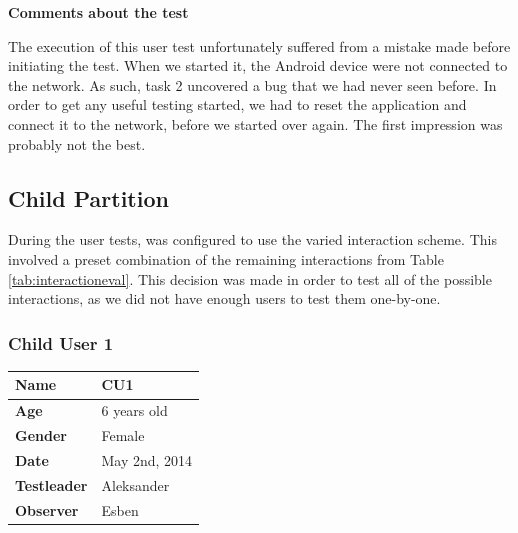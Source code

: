 \textbf{Comments about the test}

The execution of this user test unfortunately suffered from a mistake made before initiating the test. When we started it, the Android device were not connected to the network. As such, task 2 uncovered a bug that we had never seen before. In order to get any useful testing started, we had to reset the application and connect it to the network, before we started over again. The first impression was probably not the best.   


\subsection{Child Partition}
\label{sec:childresults}

During the user tests, \ab{} was configured to use the varied interaction scheme. This involved a preset combination of the remaining interactions from Table \ref{tab:interactioneval}. This decision was made in order to test all of the possible interactions, as we did not have enough users to test them one-by-one. 

\subsubsection{Child User 1}
\begin{table}[H]
\centering
\begin{tabular}{| p{4.0cm} | p{4.0cm} |}
\hline
 \textbf{Name} & CU1 \\
 \hline
 \textbf{Age} & 6 years old \\
 \hline 
 \textbf{Gender} & Female \\
 \hline 
 \textbf{Date} & May 2nd, 2014 \\
 \hline
 \textbf{Testleader} & Aleksander \\
 \hline
 \textbf{Observer} & Esben \\
 \hline
\end{tabular}
\end{table}

